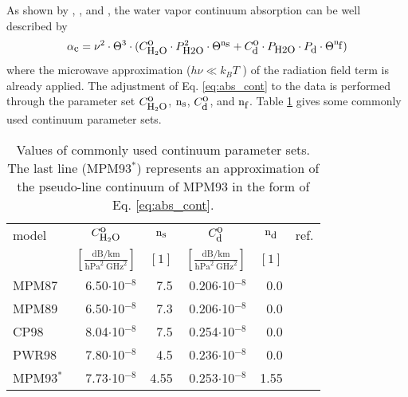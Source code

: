 {
\label{leveld:h2o_Cont}
As shown by \cite{liebeandlayton:87}, \cite{pwr:98}, and \cite{ma:90},
the water vapor continuum absorption can be well described by 
\begin{equation} 
  \label{eq:abs_cont}
  \alpha_{\mbox{\small c}} = \nu^2 \cdot \Theta^{3} \cdot 
            (C^{\mbox{\rm o}}_{\mbox{\rm \small H}_{2}\mbox{\rm \small O}} \cdot P_{\mbox{\rm \small H2O}}^2 \cdot \Theta^{{\rm n}_{\mbox{\rm \small s}}} + 
             C^{\mbox{\rm o}}_{\mbox{\rm \small d}} \cdot P_{\mbox{\rm \small H2O}} \cdot P_{\mbox{\rm \small d}} \cdot \Theta^{{\rm n}_{\mbox{\rm \small f}}})
\end{equation}
where the microwave approximation ($h\nu\ll k_BT$ ) of the radiation field term 
is already applied. The adjustment of Eq. \ref{eq:abs_cont} to the data 
is performed through the parameter set $C^{\mbox{\rm o}}_{\mbox{\rm \small H}_{2}\mbox{\rm \small O}}$, ${\rm n}_{\mbox{\rm \small s}}$, $C^{\mbox{\rm o}}_{\mbox{\rm \small d}}$, and ${\rm n}_{\mbox{\rm \small f}}$. 
Table \ref{tab:wvcontparam} gives some commonly used continuum parameter sets.
\begin{table}[!hbt]
  \begin{center}
  \begin{tabular}{lrrrrr}
    \hline
    model  & \multicolumn{1}{c}{$C^{\mbox{\rm o}}_{\mbox{\rm \small H}_{2}\mbox{\rm \small O}}$} & 
             \multicolumn{1}{c}{${\rm n}_{\mbox{\rm \small s}}$}  & 
             \multicolumn{1}{c}{$C^{\mbox{\rm o}}_{\mbox{\rm \small d}}$} & 
             \multicolumn{1}{c}{${\rm n}_{\mbox{\rm \small d}}$}  & 
             ref.\\
           & \multicolumn{1}{c}{$\left[\frac{\mbox{dB/km}}
                               {\mbox{hPa}^2~\mbox{GHz}^2}\right]$} & 
             \multicolumn{1}{c}{$[1]$} & 
             \multicolumn{1}{c}{$\left[\frac{\mbox{dB/km}}
                               {\mbox{hPa}^2~\mbox{GHz}^2}\right]$} & 
             \multicolumn{1}{c}{$[1]$} & \\
    \hline
    MPM87  & 6.50$\cdot$10$^{-8}$ & 7.5 & 0.206$\cdot$10$^{-8}$  &  0.0 & \cite{liebeandlayton:87}\\
    MPM89  & 6.50$\cdot$10$^{-8}$ & 7.3 & 0.206$\cdot$10$^{-8}$  &  0.0 & \cite{liebe:89}\\
    CP98   & 8.04$\cdot$10$^{-8}$ & 7.5 & 0.254$\cdot$10$^{-8}$  &  0.0 & \cite{cruzpol:98}\\ 
    PWR98  & 7.80$\cdot$10$^{-8}$ & 4.5 & 0.236$\cdot$10$^{-8}$  &  0.0 & \cite{pwr:98}\\
    \hline
    MPM93$^*$ & 7.73$\cdot$10$^{-8}$ & 4.55 & 0.253$\cdot$10$^{-8}$  & 1.55 & \cite{liebeetal:93}\\
    \hline
 \end{tabular}
\end{center}
 \caption{Values of commonly used continuum parameter sets. The last line (MPM93$^*$)
   represents an approximation of the pseudo-line continuum of MPM93
   in the form of Eq. \ref{eq:abs_cont}.}
 \label{tab:wvcontparam}
\end{table}

}
